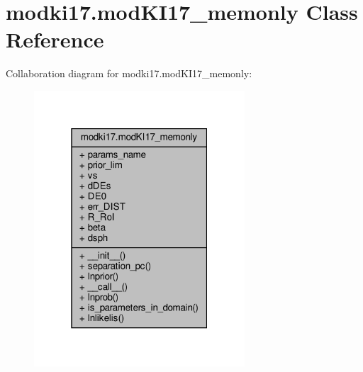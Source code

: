 \hypertarget{classmodki17_1_1modKI17__memonly}{}\section{modki17.\+mod\+K\+I17\+\_\+memonly Class Reference}
\label{classmodki17_1_1modKI17__memonly}


Collaboration diagram for modki17.\+mod\+K\+I17\+\_\+memonly\+:\nopagebreak
\begin{figure}[H]
\begin{center}
\leavevmode
\includegraphics[width=223pt]{da/d4b/classmodki17_1_1modKI17__memonly__coll__graph}
\end{center}
\end{figure}
